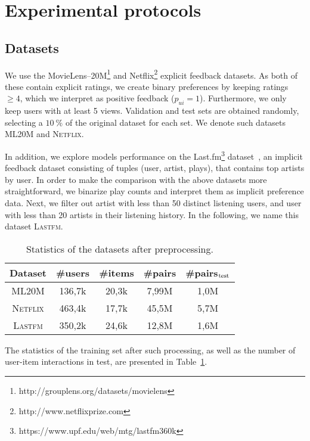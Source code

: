 \section{Experimental protocols}\label{sec:protocols}
\subsection{Datasets}

We use the 
MovieLens--20M\footnote{http://grouplens.org/datasets/movielens}
and Netflix\footnote{http://www.netflixprize.com} explicit feedback  datasets.
As both  of these contain explicit ratings, we create binary preferences
by keeping ratings $\ge\!4$, which we interpret as positive feedback ($p_{ui}=1$).
Furthermore, we only keep users with at least 5 views.
Validation and test sets are obtained randomly, selecting a $10~\%$ of the original dataset for each set. We denote such datasets \textsc{ML20M} and \textsc{Netflix}.

In addition, we explore models performance on the Last.fm\footnote{https://www.upf.edu/web/mtg/lastfm360k} dataset~\cite{Celma:Springer2010}, an implicit feedback dataset consisting of tuples (user, artist, plays), that contains top artists by user. In order to make the comparison with the above datasets more straightforward, we binarize play counts and interpret them as implicit preference data. Next, we filter out artist with less than 50 distinct listening users, and user with less than 20 artists in their listening history. In the following, we name this dataset \textsc{Lastfm}.

\setlength{\belowcaptionskip}{5pt}
\begin{table}[htb]
\begin{tabular}{c c c c c}
 Dataset & \#users & \#items & \#pairs & \#pairs$_{\rm test}$ \\
\hline
\textsc{ML20M} & 136,7k & 20,3k & 7,99M & 1,0M \\
\textsc{Netflix}  & 463,4k & 17,7k & 45,5M & 5,7M \\
\textsc{Lastfm}  & 350,2k & 24,6k & 12,8M & 1,6M \\
\hline
\end{tabular}
\caption{Statistics of the datasets after preprocessing.}
\label{table:datasets}
\end{table}

The statistics of the training set after such  processing, as well as the number of user-item interactions in test, are presented in Table~\ref{table:datasets}. 


